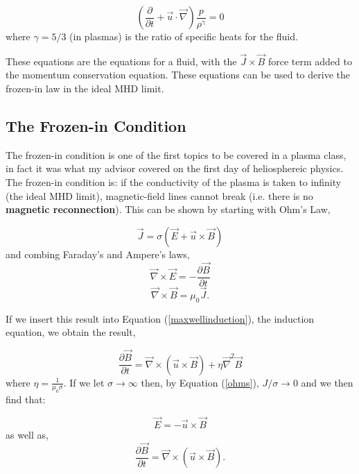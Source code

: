 \documentclass[%
 reprint,
 amsmath,amssymb,
 aps,
]{revtex4-1}
\begin{document}
\begin{equation}
\left(\frac{\partial }{\partial t} + \vec{u} \cdot \vec{\nabla}\right) \frac{p}{\rho^{\gamma}} = 0  
\end{equation}
where $\gamma = 5/3$ (in plasmas) is the ratio of specific heats for the fluid.


These equations are the equations for a fluid, with the $\vec{J} \times \vec{B}$ force term added to the momentum conservation equation. These equations can be used to derive the frozen-in law in the ideal MHD limit.             


\subsection{The Frozen-in Condition}

The frozen-in condition is one of the first topics to be covered in a plasma class, in fact it was what my advisor covered on the first day of heliosphereic physics. The frozen-in condition is: if the conductivity of the plasma is taken to infinity (the ideal MHD limit), magnetic-field lines cannot break (i.e. there is no \textbf{magnetic reconnection}). This can be shown by starting with Ohm's Law,

\begin{equation} \label{ohms}
\vec{J} = \sigma (\vec{E} + \vec{u} \times \vec{B})
\end{equation}
and combing Faraday's and Ampere's laws,
\begin{equation} \label{maxwellinduction}
\vec{\nabla} \times \vec{E} = - \frac{\partial \vec{B}}{\partial t}
\end{equation}
\begin{equation}
\vec{\nabla} \times \vec{B} = \mu_0 \vec{J}.
\end{equation}

If we insert this result into Equation (\ref{maxwellinduction}), the induction equation, we obtain the result,%

\begin{equation}\label{induction}
\frac{\partial \vec{B}}{\partial t} = \vec{\nabla} \times (\vec{u} \times \vec{B})  + \eta \vec{\nabla}^2 \vec{B}
\end{equation}
where $\eta = \frac{1}{\mu_0 \sigma} $. If we let $\sigma \to \infty$ then, by Equation (\ref{ohms}), $\displaystyle J / \sigma \to 0 $ and we then find that:

\begin{equation}
\vec{E} = - \vec{u} \times \vec{B}
\end{equation}
as well as,
\begin{equation}
\frac{\partial \vec{B}}{\partial t} = \vec{\nabla} \times (\vec{u} \times \vec{B}).
\end{equation}
\end{document}
